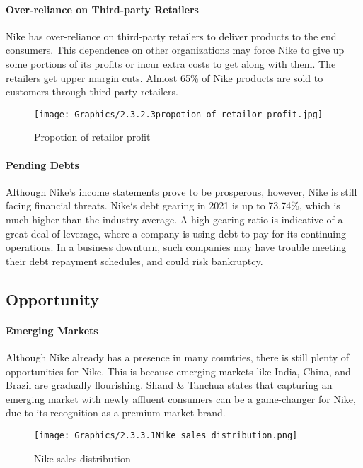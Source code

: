 \documentclass[a4paper, 12pt]{report}
\begin{document}
\paragraph{Over-reliance on Third-party Retailers}
Nike has over-reliance on third-party retailers to deliver products to the end consumers. This dependence on other organizations may force Nike to give up some portions of its profits or incur extra costs to get along with them. The retailers get upper margin cuts. Almost 65\% of Nike products are sold to customers through third-party retailers.
 \begin{figure}[ht]
 			\begin{center}
				\texttt{[image: Graphics/2.3.2.3propotion of retailor profit.jpg]}
			\end{center}
       		\caption{\label{2.3.2.3}Propotion of retailor profit}
 \end{figure}
\paragraph{Pending Debts}
Although Nike’s income statements prove to be prosperous, however, Nike is still facing financial threats. Nike‘s debt gearing in 2021 is up to 73.74\%, which is much higher than the industry average. A high gearing ratio is indicative of a great deal of leverage, where a company is using debt to pay for its continuing operations. In a business downturn, such companies may have trouble meeting their debt repayment schedules, and could risk bankruptcy.
\subsection{Opportunity}

\paragraph{Emerging Markets}
Although Nike already has a presence in many countries, there is still plenty of opportunities for Nike. This is because emerging markets like India, China, and Brazil are gradually flourishing. Shand & Tanchua states that capturing an emerging market with newly affluent consumers can be a game-changer for Nike, due to its recognition as a premium market brand.   
 \begin{figure}[ht]
 			\begin{center}
				\texttt{[image: Graphics/2.3.3.1Nike sales distribution.png]}
			\end{center}
       		\caption{\label{2.3.3.1}Nike sales distribution}
 \end{figure}
\end{document}
